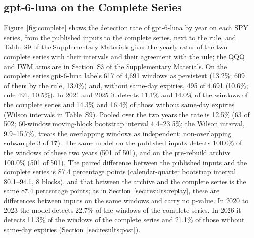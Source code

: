 \subsection{gpt-6-luna on the Complete Series}
\label{sec:results:complete}

Figure~\ref{fig:complete} shows the detection rate of gpt-6-luna by year on each SPY series, from the published inputs to the complete series, next to the rule, and Table~S9 of the Supplementary Materials gives the yearly rates of the two complete series with their intervals and their agreement with the rule; the QQQ and IWM arms are in Section~S3 of the Supplementary Materials.
On the complete series gpt-6-luna labels 617 of 4{,}691 windows as persistent (13.2\%; 609 of them by the rule, 13.0\%) and, without same-day expiries, 495 of 4{,}691 (10.6\%; rule 491, 10.5\%). In 2024 and 2025 it detects 11.1\% and 14.0\% of the windows of the complete series and 14.3\% and 16.4\% of those without same-day expiries (Wilson intervals in Table~S9). Pooled over the two years the rate is 12.5\% (63 of 502; 60-window moving-block bootstrap interval 4.4--23.5\%; the Wilson interval, 9.9--15.7\%, treats the overlapping windows as independent; non-overlapping subsample 3 of 17). The same model on the published inputs detects 100.0\% of the windows of these two years (501 of 501), and on the pre-rebuild archive 100.0\% (501 of 501). The paired difference between the published inputs and the complete series is 87.4 percentage points (calendar-quarter bootstrap interval 80.1--94.1, 8 blocks), and that between the archive and the complete series is the same 87.4 percentage points; as in Section~\ref{sec:results:replay}, these are differences between inputs on the same windows and carry no p-value. In 2020 to 2023 the model detects 22.7\% of the windows of the complete series. In 2026 it detects 11.3\% of the windows of the complete series and 21.1\% of those without same-day expiries (Section~\ref{sec:results:post}).

